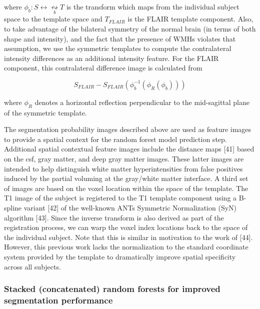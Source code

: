 \documentclass[11pt,]{article}
\begin{document}
where \(\phi_b: S \leftrightarrow \underset{b}{\leftrightsquigarrow} T\)
is the transform which maps from the individual subject space to the
template space and \(T_{FLAIR}\) is the FLAIR template component. Also,
to take advantage of the bilateral symmetry of the normal brain (in
terms of both shape and intensity), and the fact that the presence of
WMHs violates that assumption, we use the symmetric templates to compute
the contralateral intensity differences as an additional intensity
feature. For the FLAIR component, this contralateral difference image is
calculated from

\[S_{FLAIR} - S_{FLAIR}\left(\phi_b^{-1}\left(\phi_R\left(\phi_b\right)\right)\right)\]

where \(\phi_R\) denotes a horizontal reflection perpendicular to the
mid-sagittal plane of the symmetric template.

The segmentation probability images described above are used as feature
images to provide a spatial context for the random forest model
prediction step. Additional spatial contextual feature images include
the distance maps {[}41{]} based on the csf, gray matter, and deep gray
matter images. These latter images are intended to help distinguish
white matter hyperintensities from false positives induced by the
partial voluming at the gray/white matter interface. A third set of
images are based on the voxel location within the space of the template.
The T1 image of the subject is registered to the T1 template component
using a B-spline variant {[}42{]} of the well-known ANTs Symmetric
Normalization (SyN) algorithm {[}43{]}. Since the inverse transform is
also derived as part of the registration process, we can warp the voxel
index locations back to the space of the individual subject. Note that
this is similar in motivation to the work of {[}44{]}. However, this
previous work lacks the normalization to the standard coordinate system
provided by the template to dramatically improve spatial specificity
across all subjects.

\subsubsection{Stacked (concatenated) random forests for improved
segmentation
performance}\label{stacked-concatenated-random-forests-for-improved-segmentation-performance}
\end{document}
